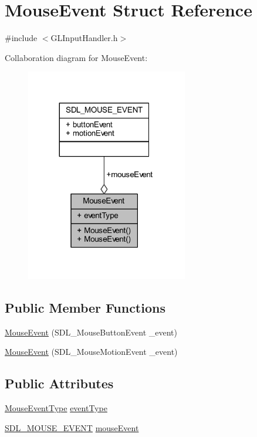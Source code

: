 \hypertarget{struct_mouse_event}{}\section{Mouse\+Event Struct Reference}
\label{struct_mouse_event}


{\ttfamily \#include $<$G\+L\+Input\+Handler.\+h$>$}



Collaboration diagram for Mouse\+Event\+:\nopagebreak
\begin{figure}[H]
\begin{center}
\leavevmode
\includegraphics[width=200pt]{struct_mouse_event__coll__graph}
\end{center}
\end{figure}
\subsection*{Public Member Functions}
\begin{DoxyCompactItemize}
\item 
\hyperlink{struct_mouse_event_a11cab9b929d1baef9e15a22d8e7d7a6a}{Mouse\+Event} (S\+D\+L\+\_\+\+Mouse\+Button\+Event \+\_\+event)
\item 
\hyperlink{struct_mouse_event_afefc615a5438d68b47ee155197f58842}{Mouse\+Event} (S\+D\+L\+\_\+\+Mouse\+Motion\+Event \+\_\+event)
\end{DoxyCompactItemize}
\subsection*{Public Attributes}
\begin{DoxyCompactItemize}
\item 
\hyperlink{_g_l_input_handler_8h_aeb86fa74ca9837fffb1d216966d74e0f}{Mouse\+Event\+Type} \hyperlink{struct_mouse_event_ae6bdad847363f462a57f8be893fd620c}{event\+Type}
\item 
\hyperlink{union_s_d_l___m_o_u_s_e___e_v_e_n_t}{S\+D\+L\+\_\+\+M\+O\+U\+S\+E\+\_\+\+E\+V\+E\+NT} \hyperlink{struct_mouse_event_a75d3e0b8d1c30db9650221cf0769704d}{mouse\+Event}
\end{DoxyCompactItemize}


